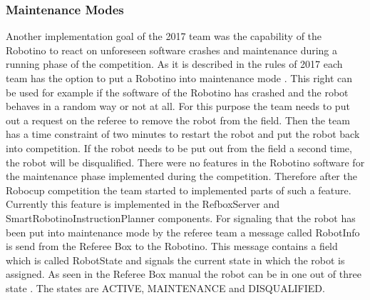 \subsubsection{Maintenance Modes}

Another implementation goal of the 2017 team was the capability of the Robotino to react on unforeseen software crashes and maintenance during a running phase of the competition. As it is described in the rules of 2017 each team has the option to put a Robotino into maintenance mode \cite{RC17} . This right can be used for example if the software of the Robotino has crashed and the robot behaves in a random way or not at all. For this purpose the team needs to put out a request on the referee to remove the robot from the field. Then the team has a time constraint of two minutes to restart the robot and put the robot back into competition. If the robot needs to be put out from the field a second time, the robot will be disqualified. There were no features in the Robotino software for the maintenance phase implemented during the competition. Therefore after the Robocup competition the team started to implemented parts of such a feature. \\

Currently this feature is implemented in the RefboxServer and SmartRobotinoInstructionPlanner components. For signaling that the robot has been put into maintenance mode by the referee team a message called RobotInfo is send from the Referee Box to the Robotino. This message contains a field which is called RobotState and signals the current state in which the robot is assigned. As seen in the Referee Box manual the robot can be in one out of three state \cite{RM15}. The states are ACTIVE, MAINTENANCE and DISQUALIFIED. \\

